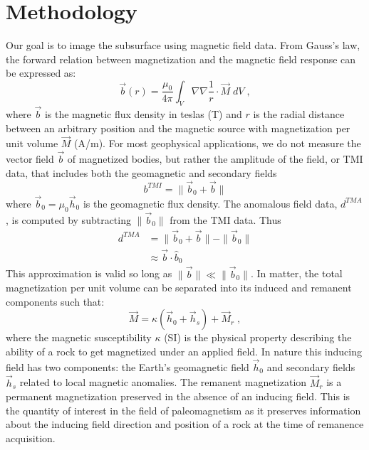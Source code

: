 \documentclass[paper]{geophysics}
\begin{document}
\section{Methodology}
Our goal is to image the subsurface using magnetic field data.
From Gauss's law, the forward relation between magnetization and the magnetic field response can be expressed as:
\begin{equation} \label{b_integral}
\vec{b}(r) = \frac{\mu_0}{4\pi} \int_{V} \nabla \nabla \frac{1}{ r} \cdot \vec{M} \; dV\;,
\end{equation}
where $\vec{b}$ is the magnetic flux density in teslas (T) and $r$ is the radial distance between an arbitrary position and the magnetic source with magnetization per unit volume $\vec{M}$ (A/m).
For most geophysical applications, we do not measure the vector field $\vec b$ of magnetized bodies, but rather the amplitude of the field, or TMI data, that includes both the geomagnetic and secondary fields
\begin{equation}
b^{TMI} = \|\vec b_0 + \vec b \|
\end{equation}
where $\vec b_0 = \mu_0\vec h_0$ is the geomagnetic flux density.
The anomalous field data, $d^{TMA}$, is computed by subtracting $\|\vec b_0\|$ from the TMI data. Thus
\begin{equation}
\begin{split}
{d}^{TMA} &=  \|\vec b_0 + \vec b \| - \|\vec b_0\| \\
&\approx \vec{b}\cdot \hat b_0
\end{split}
\end{equation}
This approximation is valid so long as $\|\vec b\| \ll \|\vec b_0\|$.
In matter, the total magnetization per unit volume can be separated into its induced and remanent components such that:
\begin{equation}\label{Magnetization}
	\vec{M} = \kappa (\vec{h}_0 + \vec{h}_s) + \vec{M}_{r}\;,
\end{equation}
where the magnetic susceptibility $\kappa$ (SI) is the physical property describing the ability of a rock to get magnetized under an applied field. In nature this inducing field has two components: the Earth's geomagnetic field $\vec{h}_0$ and secondary fields $\vec{h}_s$ related to local magnetic anomalies.
The remanent magnetization $\vec{M}_{r}$ is a permanent magnetization preserved in the absence of an inducing field. This is the quantity of interest in the field of paleomagnetism as it preserves information about the inducing field direction and position of a rock at the time of remanence acquisition.
\end{document}

